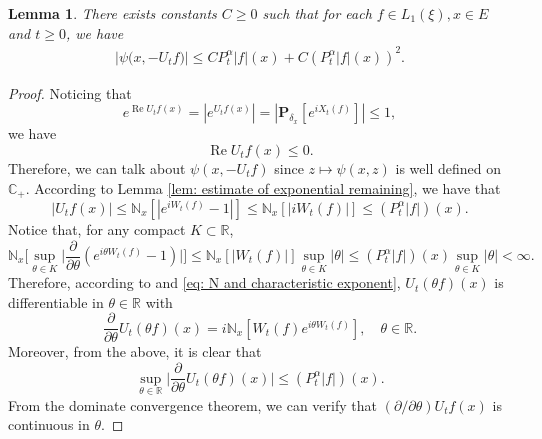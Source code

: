 \documentclass[12pt,a4paper]{amsart}
\theoremstyle{plain}
\newtheorem{lem}[thm]{Lemma}
\theoremstyle{definition}
\numberwithin{equation}{section}
\begin{document}
\begin{lem}
    There exists constants $C\geq 0$ such that for each $f \in L_1(\xi),x\in E$ and $t\geq 0$, we have
\begin{equation}\begin{split}
\label{eq: upper bound of psi(v)}
    \big|\psi\big(x,-U_tf\big)\big|
    \leq C P^\alpha_t |f|(x)+
         C (P^\alpha_t |f| (x))^2.
\end{split}\end{equation}
\end{lem}
\begin{proof}
     Noticing that
\[
     e^{\operatorname{Re} U_tf(x)}
    = |e^{U_tf(x)}|
    = |\mathbf P_{\delta_x}[e^{i X_t(f)}]|
    \leq 1,
\]
    we have
\begin{equation}
\label{eq: -v has positive real part}
 \operatorname{Re} U_tf(x)
    \leq 0.
\end{equation}
    Therefore, we can talk about $\psi(x,-U_tf)$ since $z\mapsto \psi(x,z)$ is well defined on $\mathbb C_+$.
    According to Lemma \ref{lem: estimate of exponential remaining}, we have that
\begin{equation}
\label{eq: upper bound for vf}
    |U_tf(x)| \leq \mathbb N_x[|e^{i W_t(f)} - 1|]
    \leq \mathbb N_x[|i W_t(f)|]
     \leq (P^\alpha_t |f|)(x).
\end{equation}
    Notice that, for any compact $K \subset \mathbb R$,
\begin{equation}
\label{eq: estimate of deriavetive of v(theta)}
    \mathbb N_x\Big[\sup_{\theta \in K} \Big|\frac{\partial}{\partial \theta} (e^{i\theta W_t(f)} - 1) \Big|\Big]
    \leq \mathbb N_x[|W_t(f)|] \sup_{\theta \in K}|\theta|
        \leq (P^\alpha_t |f|)(x) \sup_{\theta \in K}|\theta| < \infty.
\end{equation}
    Therefore, according to \cite[Theorem A.5.2.]{Durrett2010Probability} and \eqref{eq: N and characteristic exponent},
    $U_t(\theta f)(x)$ is differentiable in $\theta \in \mathbb R$ with
\[
    \frac{\partial}{\partial \theta} U_t(\theta f)(x)
    = i\mathbb N_x[W_t(f)e^{i\theta W_t(f)}],
    \quad \theta \in \mathbb R.
\]
    Moreover, from the above, it is clear that
\begin{equation}
\label{eq: upper bounded for derivative of v(theta)}
    \sup_{\theta \in \mathbb R}\Big| \frac{\partial}{\partial \theta}U_t(\theta f)(x)\Big|
         \leq ( P^\alpha_t |f|)(x).
\end{equation}
    From the dominate convergence theorem, we can verify that $(\partial/\partial \theta)U_tf(x)$ is continuous in $\theta$.

\end{proof}
\end{document}
